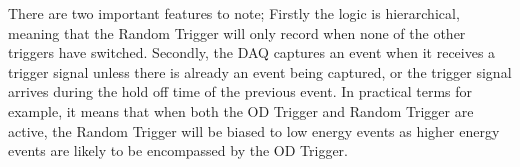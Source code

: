 \par
There are two important features to note;
Firstly the logic is hierarchical, meaning that the Random Trigger will only record when none of the other triggers have switched.
Secondly, the DAQ captures an event when it receives a trigger signal unless there is already an event being captured, or the trigger signal arrives during the hold off time of the previous event.
In practical terms for example, it means that when both the OD Trigger and Random Trigger are active, the Random Trigger will be biased to low energy events as higher energy events are likely to be encompassed by the OD Trigger.
